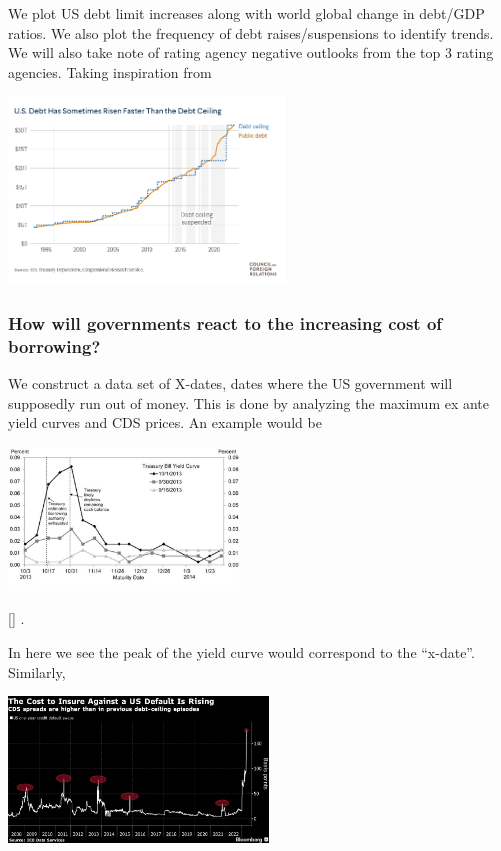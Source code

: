 \documentclass[
  12pt]{article}
\begin{document}
We plot US debt limit increases along with world global change in
debt/GDP ratios. We also plot the frequency of debt raises/suspensions
to identify trends. We will also take note of rating agency negative
outlooks from the top 3 rating agencies. Taking inspiration from

\includegraphics[width=2.89583in,height=\textheight]{style-guide/Debt plot.png}

\hypertarget{how-will-governments-react-to-the-increasing-cost-of-borrowing}{%
\subsubsection{How will governments react to the increasing cost of
borrowing?}\label{how-will-governments-react-to-the-increasing-cost-of-borrowing}}

We construct a data set of X-dates, dates where the US government will
supposedly run out of money. This is done by analyzing the maximum ex
ante yield curves and CDS prices. An example would be

\includegraphics[width=2.40625in,height=\textheight]{style-guide/x-date-estmation.jpg}

{[}\citet{boesler}{]}\citep{steinmetz-silber} .

In here we see the peak of the yield curve would correspond to the
``x-date''. Similarly,

\includegraphics[width=2.71875in,height=\textheight]{style-guide/CDS-x-date.png}
\end{document}
